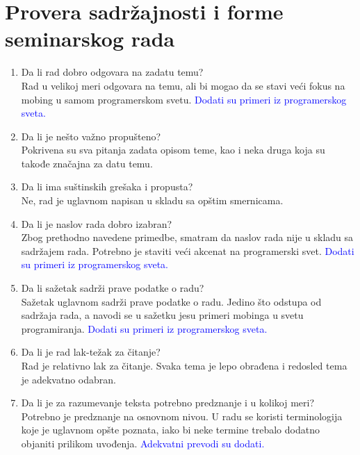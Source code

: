 \documentclass[a4paper]{report}
\newcommand{\odgovor}[1]{\textcolor{blue}{#1}}
\begin{document}
\section{Provera sadržajnosti i forme seminarskog rada}

\begin{enumerate}

\item Da li rad dobro odgovara na zadatu temu?\\
Rad u velikoj meri odgovara na temu, ali bi mogao da se stavi veći fokus na mobing u samom programerskom svetu. \odgovor{Dodati su primeri iz programerskog sveta.}

\item Da li je nešto važno propušteno?\\
Pokrivena su sva pitanja zadata opisom teme, kao i neka druga koja
su takođe značajna za datu temu.

\item Da li ima suštinskih grešaka i propusta?\\
Ne, rad je uglavnom napisan u skladu sa opštim smernicama.

\item Da li je naslov rada dobro izabran?\\
Zbog prethodno navedene primedbe, smatram da naslov rada nije u skladu sa sadržajem rada. Potrebno je staviti veći akcenat na programerski svet. \odgovor{Dodati su primeri iz programerskog sveta.}

\item Da li sažetak sadrži prave podatke o radu?\\
Sažetak uglavnom sadrži prave podatke o radu. Jedino što odstupa od sadržaja rada, a navodi se u sažetku jesu primeri mobinga u svetu programiranja. \odgovor{Dodati su primeri iz programerskog sveta.}

\item Da li je rad lak-težak za čitanje?\\
Rad je relativno lak za čitanje. Svaka tema je lepo obrađena i redosled tema je adekvatno odabran.

\item Da li je za razumevanje teksta potrebno predznanje i u kolikoj meri?\\
Potrebno je predznanje na osnovnom nivou. U radu se koristi terminologija koje je uglavnom opšte poznata, iako bi neke termine trebalo dodatno objaniti prilikom uvođenja. \odgovor{Adekvatni prevodi su dodati.}


\end{enumerate}
\end{document}
